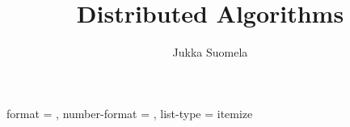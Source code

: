 
\newcommand{\definepage}[1]{\stepcounter{myexternalpagenum}\edef#1{\arabic{myexternalpagenum}}}



\def\theendnote{\AlphAlph{\value{endnote}}}

{
    format = \normalfont,
    number-format = \normalfont,
    list-type = itemize
}

\newcommand{\hint}[1]{\nopagebreak\par\hfill{\footnotesize\em $\triangleright$ hint \endnote{#1}\par}}
\newcommand{\hintnumber}[1]{#1}


\makeatletter
\renewcommand\maketitle{\begin{titlepage}
    \vspace*{\stretch{1}}
    \begin{center}
        {\Huge \@title \par}%
        \vspace{15mm}%
        {\LARGE \@author \par}%
        \vspace{3mm}
        {\large \myaffiliation \par}%
        \vspace{3mm}
        {\large \@date \par}%
        \vspace{20mm}
        {\large \mycovernote\par}
    \end{center}%
    \vspace*{\stretch{1}}
\end{titlepage}}
\makeatother

\title{Distributed Algorithms}
\author{Jukka Suomela}
\newcommand{\myaffiliation}{Aalto University, Finland}
\newcommand{\mycovernote}{%
    \url{http://users.ics.aalto.fi/suomela/da/}
}


